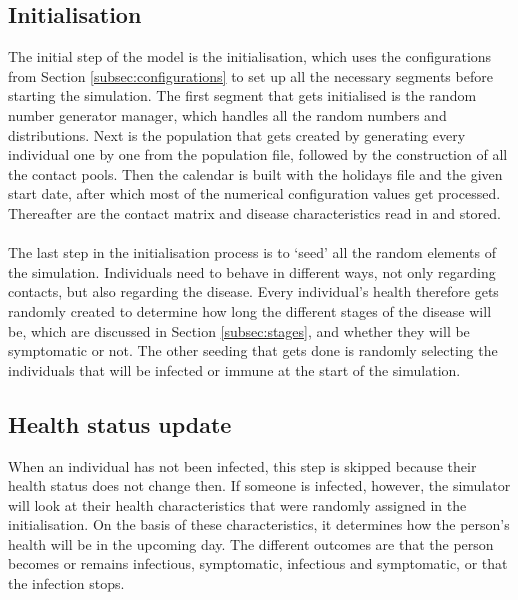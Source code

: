 \subsection{Initialisation}
\label{subsec:initialisation}
The initial step of the model is the initialisation, which uses the configurations from Section \ref{subsec:configurations} to set up all the necessary segments before starting the simulation. The first segment that gets initialised is the random number generator manager, which handles all the random numbers and distributions. Next is the population that gets created by generating every individual one by one from the population file, followed by the construction of all the contact pools. Then the calendar is built with the holidays file and the given start date, after which most of the numerical configuration values get processed. Thereafter are the contact matrix and disease characteristics read in and stored.
\\\\
The last step in the initialisation process is to `seed' all the random elements of the simulation. Individuals need to behave in different ways, not only regarding contacts, but also regarding the disease. Every individual's health therefore gets randomly created to determine how long the different stages of the disease will be, which are discussed in Section \ref{subsec:stages}, and whether they will be symptomatic or not. The other seeding that gets done is randomly selecting the individuals that will be infected or immune at the start of the simulation.

\subsection{Health status update}
\label{subsec:health_status_update}
When an individual has not been infected, this step is skipped because their health status does not change then. If someone is infected, however, the simulator will look at their health characteristics that were randomly assigned in the initialisation. On the basis of these characteristics, it determines how the person's health will be in the upcoming day. The different outcomes are that the person becomes or remains infectious, symptomatic, infectious and symptomatic, or that the infection stops.

